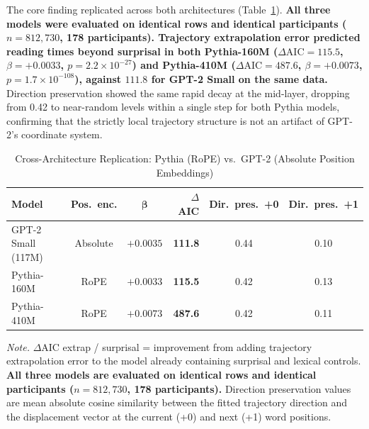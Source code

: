 \documentclass[12pt]{article}
\newcommand{\new}[1]{{\bfseries #1}}
\begin{document}
The core finding replicated across both architectures (Table~\ref{tab:crossarch}). \new{All three models were evaluated on identical rows and identical participants ($n = 812{,}730$, 178 participants). Trajectory extrapolation error predicted reading times beyond surprisal in both Pythia-160M ($\Delta\text{AIC} = 115.5$, $\beta = +0.0033$, $p = 2.2 \times 10^{-27}$) and Pythia-410M ($\Delta\text{AIC} = 487.6$, $\beta = +0.0073$, $p = 1.7 \times 10^{-108}$), against $111.8$ for GPT-2 Small on the same data.} Direction preservation showed the same rapid decay at the mid-layer, dropping from 0.42 to near-random levels within a single step for both Pythia models, confirming that the strictly local trajectory structure is not an artifact of GPT-2's coordinate system.

\begin{table}[!htbp]
\centering
\caption{Cross-Architecture Replication: Pythia (RoPE) vs.\ GPT-2 (Absolute Position Embeddings)}
\label{tab:crossarch}
\begin{tabular}{lccrcc}
\toprule
\textbf{Model} & \textbf{Pos.\ enc.} & \new{$\boldsymbol{\beta}$} & \textbf{$\Delta$AIC} & \textbf{Dir.\ pres.\ +0} & \textbf{Dir.\ pres.\ +1} \\
\midrule
GPT-2 Small (117M) & Absolute & \new{$+0.0035$} & \new{111.8} & 0.44 & 0.10 \\
Pythia-160M & RoPE & \new{$+0.0033$} & \new{115.5} & 0.42 & 0.13 \\
Pythia-410M & RoPE & \new{$+0.0073$} & \new{487.6} & 0.42 & 0.11 \\
\bottomrule
\end{tabular}

\smallskip
\footnotesize
\textit{Note.} $\Delta$AIC extrap / surprisal = improvement from adding trajectory extrapolation error to the model already containing surprisal and lexical controls. \new{All three models are evaluated on identical rows and identical participants ($n = 812{,}730$, 178 participants).} Direction preservation values are mean absolute cosine similarity between the fitted trajectory direction and the displacement vector at the current (+0) and next (+1) word positions.
\end{table}
\end{document}
